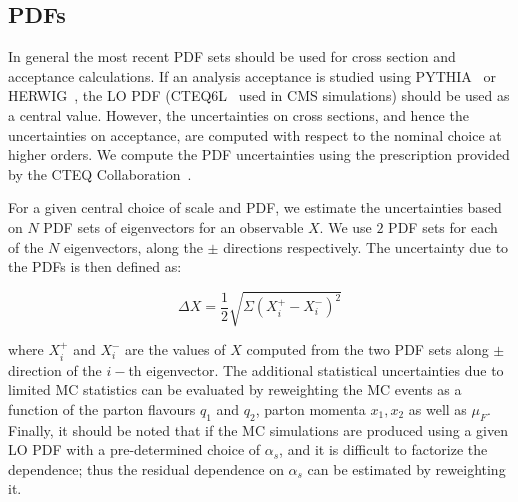 \subsection{PDFs}
In general the most recent PDF sets should be used for cross section and 
acceptance calculations. If an analysis acceptance is studied using 
PYTHIA~\cite{Pythia} or HERWIG~\cite{Herwig}, the LO PDF (CTEQ6L~\cite{cteq6m} 
used in CMS simulations) should be used as a central value. However, the 
uncertainties on cross sections, and hence the uncertainties on acceptance, are 
computed with respect to the nominal choice at higher orders. %
We compute the PDF uncertainties using the prescription provided by the CTEQ 
Collaboration~\cite{cteq6m}. 

For a given central choice of scale and PDF, we estimate the uncertainties 
based on $N$ PDF sets of eigenvectors for an observable $X$. We use $2$ PDF 
sets for each of the $N$ eigenvectors, along the $\pm$ directions respectively. 
The uncertainty due to the PDFs is then defined as:

\begin{equation}
	\Delta X = \frac{1}{2} \sqrt{\Sigma (X_i^+ - X_i^-)^2 }
\end{equation}

where $X_i^+$ and $X_i^-$ are the values of $X$ computed from the two PDF sets 
along $\pm$ direction of the $i-$th eigenvector. The additional statistical 
uncertainties due to limited MC statistics can be evaluated by reweighting the 
MC events as a function of the parton flavours $q_1$ and $q_2$, parton momenta 
$x_1, x_2$ as well as $\mu_F$. Finally, it should be noted that if the MC
simulations are produced using a given LO PDF with a pre-determined choice of 
$\alpha_s$, and it is difficult to factorize the dependence; thus the residual 
dependence on $\alpha_s$ can be estimated by reweighting it.
